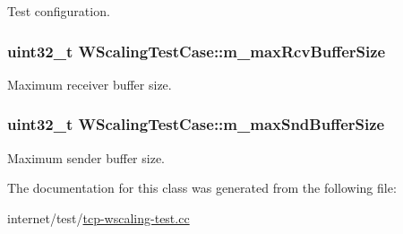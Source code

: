 Test configuration. 

\subsubsection[{\texorpdfstring{m\+\_\+max\+Rcv\+Buffer\+Size}{m_maxRcvBufferSize}}]{\setlength{\rightskip}{0pt plus 5cm}uint32\+\_\+t W\+Scaling\+Test\+Case\+::m\+\_\+max\+Rcv\+Buffer\+Size\hspace{0.3cm}{\ttfamily [protected]}}\hypertarget{classWScalingTestCase_aab726a687911081a9ef7ef2d04fc7460}{}\label{classWScalingTestCase_aab726a687911081a9ef7ef2d04fc7460}


Maximum receiver buffer size. 

\subsubsection[{\texorpdfstring{m\+\_\+max\+Snd\+Buffer\+Size}{m_maxSndBufferSize}}]{\setlength{\rightskip}{0pt plus 5cm}uint32\+\_\+t W\+Scaling\+Test\+Case\+::m\+\_\+max\+Snd\+Buffer\+Size\hspace{0.3cm}{\ttfamily [protected]}}\hypertarget{classWScalingTestCase_ad67ac3c105f7b5d89576c941362e0083}{}\label{classWScalingTestCase_ad67ac3c105f7b5d89576c941362e0083}


Maximum sender buffer size. 



The documentation for this class was generated from the following file\+:\begin{DoxyCompactItemize}
\item 
internet/test/\hyperlink{tcp-wscaling-test_8cc}{tcp-\/wscaling-\/test.\+cc}\end{DoxyCompactItemize}
